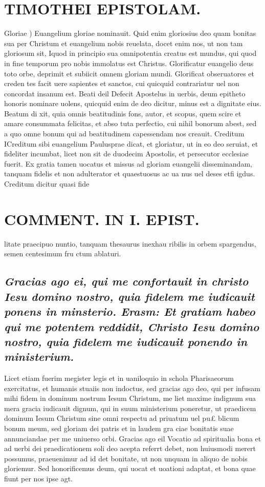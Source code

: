 \documentclass{article}
\begin{document}
\begin{pages}
\section*{TIMOTHEI EPISTOLAM. }
\marginpar{[ p.23 ]}\pstart Gloriae ) Euangelium gloriae nominauit. Quid enim gloriosius deo quam bonitas sua per Christum et euangelium nobis reuelata, docet enim nos, ut non tam gloriosum sit, Iquod in principio sua omnipotentia creatus est mundus, qui quod in fine temporum pro nobis immolatus est Christus. Glorificatur euangelio deus toto orbe, deprimit et subiicit omnem gloriam mundi. Glorificat obseruatores et creden tes facit uere sapientes et sanctos, cui quicquid contrariatur uel non concordat insanum est.  \pend\pstart Beati deil Defecit Apostelus in uerbis, deum epitheto honoris nominare uolens, quicquid enim de deo dicitur, minus est a dignitate eius. Beatum di xit, quia omnis beatitudinis fons, autor, et scopus, quem scire et amare consummata felicitas, et abso tuta perfectio, cui nihil bonorum abest, sed a quo omne bonum qui ad beatitudinem capessendam nos creauit.  \pend\pstart Creditum ICreditum sibi euangelium Paulusprae dicat, et gloriatur, ut in eo deo seruiat, et fideliter incumbat, licet non sit de duodecim Apostolis, et persecutor ecclesiae fuerit. Ex gratia tamen uocatus et missus ad gloriam euangelii disseminandam, tanquam fidelis et non adulterator et quaestuosus ac ua nus uel deses etfi igdus. Creditum dicitur quasi fide  \pend
\section*{COMMENT. IN I. EPIST. }
\marginpar{[ p.24 ]}\pstart litate praecipuo nuntio, tanquam thesaurus inexhau ribilis in orbem spargendus, semen centesimum fru ctum ablaturi.  \pend
{}
{}
\subsection*{\textit{Gracias ago ei, qui me confortauit in christo Iesu domino nostro, quia fidelem me iudicauit ponens in minsterio. Erasm: Et gratiam habeo qui me potentem reddidit, Christo Iesu domino nostro, quia fidelem me iudicauit ponendo in ministerium. }}\pstart Licet etiam fuerim megister legis et in uaniloquio in schola Pharisaeorum exercitatus, et humanis stuaiis non indoctus, sed gracias ago deo, qui per infusam mihi fidem in dominum nostrum Iesum Christum, me liet maxime indignum sua mera gracia iudicauit dignum, qui in suum ministerium poneretur, ut praedicem dominum Iesum Christum sine omni respectu ad priuatum uel pu£ blicum bonum meum, sed gloriam dei patris et in laudem gra ciae bonitatis suae annunciandae per me uniuerso orbi.  \pend\pstart Gracias ago eil Vocatio ad spiritualia bona et ad uerbi dei praedicationem soli deo acepta referrt debet, non huiusmodi merert possumus, praeuenimur ad id det bonitate, ut non unquam in aliquo de nobis gloriemur. Sed honorificemus deum, qui uocat et uoationi adaptat, et bona quae fiunt per nos ipse agt.  \pend

\end{pages}
\end{document}
